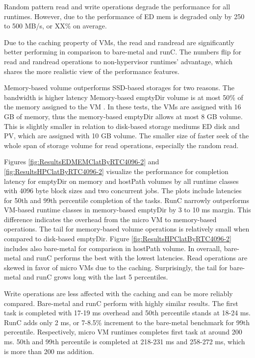 
Random pattern read and write operations degrade the performance for all runtimes. However, due to the performance of ED mem is degraded only by 250 to 500 MB/s, or XX\% on average. 

Due to the caching property of VMs, the read and randread are significantly better performing in comparison to bare-metal and runC. The numbers flip for read and randread operations to non-hypervisor runtimes' advantage, which shares the more realistic view of the performance features.

Memory-based volume outperforms SSD-based storages for two reasons. The bandwidth is higher latency 
Memory-based emptyDir volume is at most 50\% of the memory assigned to the VM \cite{VolumesKubernetes}. In these tests, the VMs are assigned with 16 GB of memory, thus the memory-based emptyDir allows at most 8 GB volume. This is slightly smaller in relation to disk-based storage mediums ED disk and PV, which are assigned with 10 GB volume. The smaller size of faster seek of the whole span of storage volume for read operations, especially the random read.




Figures \ref{fig:ResultsEDMEMClatByRTC4096-2} and \ref{fig:ResultsHPClatByRTC4096-2} visualize the performance for completion latency for emptyDir on memory and hostPath volumes by all runtime classes with 4096 byte block sizes and two concurrent jobs. The plots include latencies for 50th and 99th percentile completion of the tasks. RunC narrowly outperforms VM-based runtime classes in memory-based emptyDir by 3 to 10 ms margin. This difference indicates the overhead from the micro VM to memory-based operations. The tail for memory-based volume operations is relatively small when compared to disk-based emptyDir. Figure \ref{fig:ResultsHPClatByRTC4096-2} includes also bare-metal for comparison in hostPath volume. In overaall, bare-metal and runC performs the best with the lowest latencies. Read operations are skewed in favor of micro VMs due to the caching. Surprisingly, the tail for bare-metal and runC grows long with the last 5 percentiles.

Write operations are less affected with the caching and can be more reliably compared. Bare-metal and runC perform with highly similar results. The first task is completed with 17-19 ms overhead and 50th percentile stands at 18-24 ms. RunC adds only 2 ms, or 7-8.5\% increment to the bare-metal benchmark for 99th percentile. Respectively, micro VM runtimes completes first task at around 200 ms. 50th and 99th percentile is completed at 218-231 ms and 258-272 ms, which is more than 200 ms addition.

